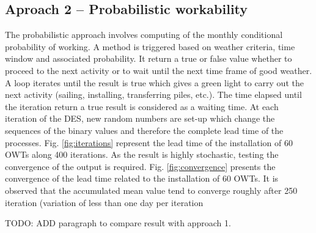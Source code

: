 \subsection{Aproach 2 -- Probabilistic workability}
The probabilistic approach involves computing of the monthly conditional probability of working. A method is triggered based on weather criteria, time window and associated probability. It return a true or false value whether to proceed to the next activity or to wait until the next time frame of good weather. A loop iterates until the result is true which gives a green light to carry out the next activity (sailing, installing, transferring piles, etc.). The time elapsed until the iteration return a true result is considered as a waiting time. At each iteration of the DES, new random numbers are set-up which change the sequences of the binary values and therefore the complete lead time of the processes. Fig. \ref{fig:iterations} represent the lead time of the installation of 60 OWTs along 400 iterations. As the result is highly stochastic, testing the convergence of the output is required. Fig. \ref{fig:convergence} presents the convergence of the lead time related to the installation of 60 OWTs. It is observed that the accumulated mean value tend to converge roughly after 250 iteration (variation of less than one day per iteration

TODO: ADD paragraph to compare result with approach 1.